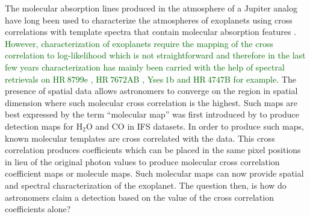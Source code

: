 \documentclass{aa}
\newcommand{\newchange}[1]{\textcolor{darkgreen}{#1}}
\begin{document}
The molecular absorption lines produced in the atmosphere of a Jupiter analog have long been used to characterize the atmospheres of exoplanets using cross correlations with template spectra \cite[e.g][]{birkby2013detection,snellen2010orbital} that contain molecular absorption features \citep[e.g][]{2003BTsettl}.
\newchange{However, characterization of exoplanets require the mapping of the cross correlation to log-likelihood which is not straightforward and therefore in the last few years characterization has mainly been carried with the help of spectral retrievals on HR$~8799$e \citep[][]{2020MolliereHR8799e}, HR$~7672$AB \citep[][]{2022WangHR7672AB}, Yses$~1$b \citep[][]{2022Zhang} and HR$~4747$B \citep[][]{2022Xuan4747B} for example.}
The presence of spatial data allows astronomers to converge on the region in spatial dimension where such molecular cross correlation is the highest.
Such maps are best expressed by the term ``molecular map'' was first introduced by \citet{2018AHoeijmakersMM} to produce detection maps for \rm{H$_2$O} and \rm{CO} in IFS datasets.
In order to produce such maps, known molecular templates are cross correlated with the data.
This cross correlation produces coefficients which can be placed in the same pixel positions in lieu of the original photon values to produce molecular cross correlation coefficient maps or molecule maps.
Such molecular maps can now provide spatial and spectral characterization of the exoplanet.
The question then, is how do astronomers claim a detection based on the value of the cross correlation coefficients alone?
\end{document}

